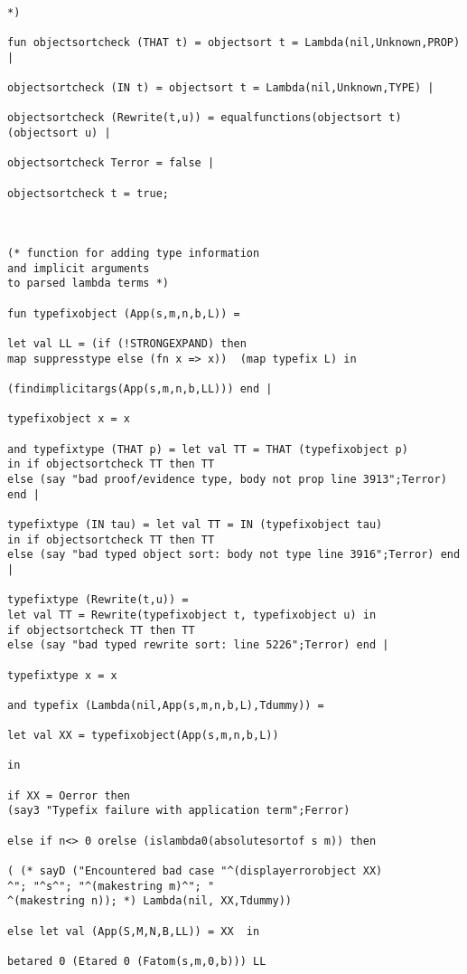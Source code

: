 \documentclass[12pt]{article}
\begin{document}
\begin{verbatim}

*)

fun objectsortcheck (THAT t) = objectsort t = Lambda(nil,Unknown,PROP) |

objectsortcheck (IN t) = objectsort t = Lambda(nil,Unknown,TYPE) |

objectsortcheck (Rewrite(t,u)) = equalfunctions(objectsort t)(objectsort u) |

objectsortcheck Terror = false |

objectsortcheck t = true;



(* function for adding type information 
and implicit arguments
to parsed lambda terms *)

fun typefixobject (App(s,m,n,b,L)) =

let val LL = (if (!STRONGEXPAND) then  
map suppresstype else (fn x => x))  (map typefix L) in

(findimplicitargs(App(s,m,n,b,LL))) end |

typefixobject x = x

and typefixtype (THAT p) = let val TT = THAT (typefixobject p) 
in if objectsortcheck TT then TT 
else (say "bad proof/evidence type, body not prop line 3913";Terror) end |

typefixtype (IN tau) = let val TT = IN (typefixobject tau) 
in if objectsortcheck TT then TT 
else (say "bad typed object sort: body not type line 3916";Terror) end |

typefixtype (Rewrite(t,u)) = 
let val TT = Rewrite(typefixobject t, typefixobject u) in
if objectsortcheck TT then TT
else (say "bad typed rewrite sort: line 5226";Terror) end |

typefixtype x = x 

and typefix (Lambda(nil,App(s,m,n,b,L),Tdummy)) =

let val XX = typefixobject(App(s,m,n,b,L)) 

in

if XX = Oerror then 
(say3 "Typefix failure with application term";Ferror)

else if n<> 0 orelse (islambda0(absolutesortof s m)) then

( (* sayD ("Encountered bad case "^(displayerrorobject XX)
^"; "^s^"; "^(makestring m)^"; "
^(makestring n)); *) Lambda(nil, XX,Tdummy))

else let val (App(S,M,N,B,LL)) = XX  in

betared 0 (Etared 0 (Fatom(s,m,0,b))) LL


\end{verbatim}
\end{document}
